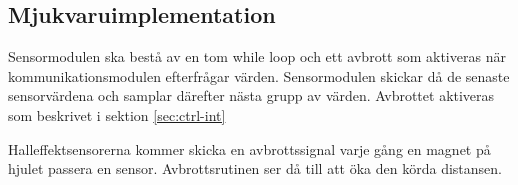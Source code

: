 \documentclass[designspec/spec.tex]{subfiles}
\begin{document}
\subsection{Mjukvaruimplementation} 
Sensormodulen ska bestå av en tom while loop och ett avbrott som aktiveras när
kommunikationsmodulen efterfrågar värden. Sensormodulen skickar då de senaste
sensorvärdena och samplar därefter nästa grupp av värden. Avbrottet aktiveras
som beskrivet i sektion \ref{sec:ctrl-int}

Halleffektsensorerna kommer skicka en avbrottssignal varje gång en magnet på
hjulet passera en sensor. Avbrottsrutinen ser då till att öka den körda
distansen.
\end{document}
